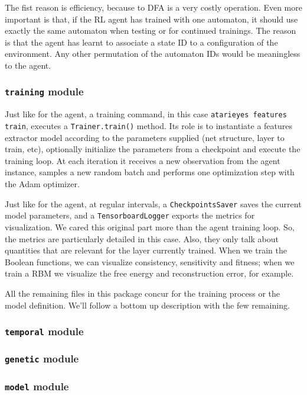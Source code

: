 The fist reason is efficiency, because \ldl{} to DFA is a very costly
operation. Even more important is that, if the RL agent has trained with one
automaton, it should use exactly the same automaton when testing or for
continued trainings. The reason is that the agent has learnt to associate a
state ID to a configuration of the environment. Any other permutation of the
automaton IDs would be meaningless to the agent.


\subsubsection*{\texttt{training} module}

Just like for the agent, a training command, in this case
\verb|atarieyes features train|, executes a \verb|Trainer.train()| method.
Its role is to instantiate a features extractor model according to the
parameters supplied (net structure, layer to train, etc), optionally
initialize the parameters from a checkpoint and execute the training loop.
At each iteration it receives a new observation from the agent instance,
samples a new random batch and performs one optimization step with the Adam
optimizer.

Just like for the agent, at regular intervals, a \texttt{CheckpointsSaver}
saves the current model parameters, and a \texttt{TensorboardLogger} exports
the metrics for visualization. We cared this original part more than the agent
training loop. So, the metrics are particularly detailed in this case. Also,
they only talk about quantities that are relevant for the layer currently
trained. When we train the Boolean functions, we can visualize consistency,
sensitivity and fitness; when we train a RBM we visualize the free energy and
reconstruction error, for example.

All the remaining files in this package concur for the training process or the
model definition. We'll follow a bottom up description with the few remaining.


\subsubsection*{\texttt{temporal} module}

\subsubsection*{\texttt{genetic} module}

\subsubsection*{\texttt{model} module}


